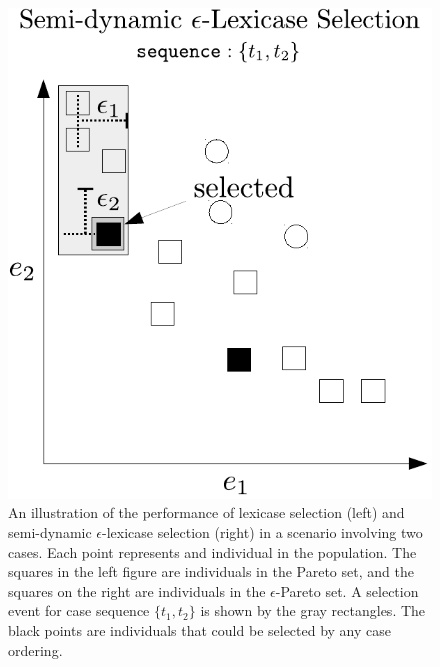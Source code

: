 \documentclass[twoside]{article}
\begin{document}
\begin{figure}[tb]
\begin{minipage}{0.49\textwidth}
  \includegraphics[width = \textwidth]{figs/ep-lex_pareto2.pdf}
\end{minipage}
\caption{An illustration of the performance of lexicase selection (left) and semi-dynamic $\epsilon$-lexicase selection (right) in a scenario involving two cases. Each point represents and individual in the population. The squares in the left figure are individuals in the Pareto set, and the squares on the right are individuals in the $\epsilon$-Pareto set. A selection event for case sequence $\{t_1,t_2\}$ is shown by the gray rectangles. The black points are individuals that could be selected by any case ordering.}\label{fig:lex_pareto}
\end{figure}
 
\end{document}
